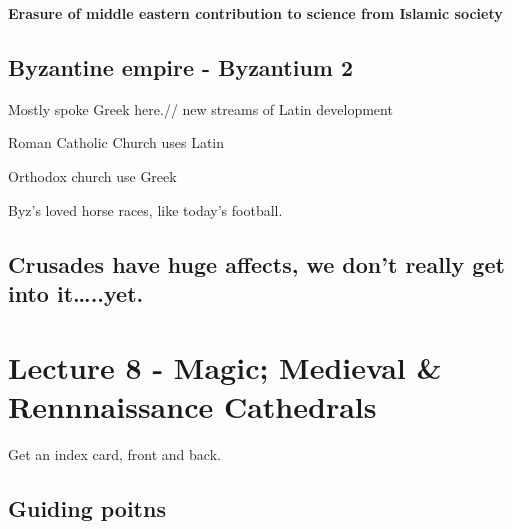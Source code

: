 \documentclass[11pt]{article}
\begin{document}
\textbf{Erasure of middle eastern contribution to science from Islamic society}

\subsection{Byzantine empire - Byzantium 2}
\label{sec-8-20}
Mostly spoke Greek here.//
new streams of Latin development

Roman Catholic Church uses Latin

Orthodox church use Greek

Byz's loved horse races, like today's football.

\subsection{Crusades have huge affects, we don't really get into it\ldots{}..yet.}
\label{sec-8-21}

\section{Lecture 8 - Magic; Medieval \& Rennnaissance Cathedrals}
\label{sec-9}
Get an index card, front and back.
\subsection{Guiding poitns}
\label{sec-9-1}
\end{document}
